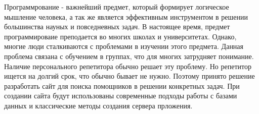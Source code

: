 \Introduction

Программрование - важнейший предмет, который формирует логическое мышление человека, а так же является эффективным инструментом в решении большинства науных и повседневных задач. В настоящее время, предмет программироваие преподается во многих школах и университетах. Однако, многие люди сталкиваются с проблемами в изучении этого предмета. Данная проблема связана с обучением в группах, что для многих затрудняет понимание. Наличие персонального репетитора обычно решает эту проблему. Но репетитор ищется на долгий срок, что обычно бывает не нужно. Поэтому принято решение разработать сайт для поиска помощников в решении конкретных задач. При создании сайта будут использованы современные подходы работы с базами данных и классические методы создания сервера прложения.